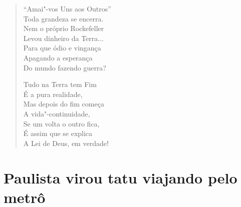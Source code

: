 \begin{verse}
``Amai"-vos Uns aos Outros'' \\
Toda grandeza se encerra. \\
Nem o próprio Rockefeller \\
Levou dinheiro da Terra... \\
Para que ódio e vingança \\
Apagando a esperança \\
Do mundo fazendo guerra? 
\pagebreak

Tudo na Terra tem Fim \\
É a pura realidade, \\
Mas depois do fim começa \\
A vida"-continuidade, \\
Se um volta o outro fica, \\
É assim que se explica \\
A Lei de Deus, em verdade! 
\end{verse}

\chapter{Paulista virou tatu viajando pelo metrô}

